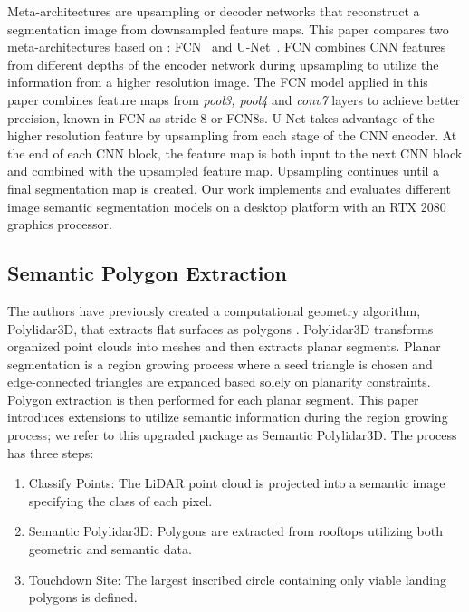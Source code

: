 Meta-architectures are upsampling or decoder networks that reconstruct a segmentation image from downsampled feature maps. This paper compares two meta-architectures based on \cite{siam_comparative_2018}: FCN~\cite{shelhamer_fully_2017} and U-Net~\cite{ronneberger_u-net_2015}. FCN combines CNN features from different depths of the encoder network during upsampling to utilize the information from a higher resolution image. The FCN model applied in this paper combines feature maps from \textit{pool3, pool4} and \textit{conv7} layers to achieve better precision, known in FCN as stride 8 or FCN8s. U-Net takes advantage of the higher resolution feature by upsampling from each stage of the CNN encoder. At the end of each CNN block, the feature map is both input to the next CNN block and combined with the upsampled feature map.  Upsampling continues until a final segmentation map is created.
Our work implements and evaluates different image semantic segmentation models \cite{siam_comparative_2018} on a desktop platform with an RTX 2080 graphics processor.

\subsection{Semantic Polygon Extraction}\label{sec:ch6_methods_semantic_polygons}

The authors have previously created a computational geometry algorithm, Polylidar3D, that extracts flat surfaces as polygons  \cite{castagno_polylidar3d_2020}. Polylidar3D transforms organized point clouds into meshes and then extracts planar segments. Planar segmentation is a region growing process where a seed triangle is chosen and edge-connected triangles are expanded based solely on planarity constraints. Polygon extraction is then performed for each planar segment. This paper introduces extensions to utilize semantic information during the region growing process; we refer to this upgraded package as Semantic Polylidar3D. The process has three steps:

\begin{enumerate}
    \item Classify Points: The LiDAR point cloud is projected into a semantic image specifying the class of each pixel.
    \item Semantic Polylidar3D: Polygons are extracted from rooftops utilizing both geometric and semantic data.
    \item Touchdown Site:  The largest inscribed circle containing only viable landing polygons is defined.
\end{enumerate}

